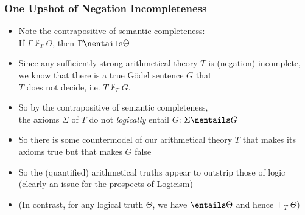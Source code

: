 \begin{frame}
\frametitle{One Upshot of Negation Incompleteness}

\begin{itemize}[<+->]

\item Note the contrapositive of semantic completeness: \\ If $\Gamma \nvdash_{T} \Theta$, then $\Gamma \nentails \Theta$

\item Since any sufficiently strong arithmetical theory $T$ is (negation) incomplete, we know that there is a true G\"odel sentence $G$ that \\ $T$ does not decide, i.e. $T \nvdash_T G$.

\item So by the contrapositive of semantic completeness, \\ the axioms $\Sigma$ of $T$ do not \textit{logically} entail $G$: $\Sigma \nentails G$

\item So there is some countermodel of our arithmetical theory $T$ that makes its axioms true but that makes $G$ false

\item So the (quantified) arithmetical truths appear to outstrip those of logic (clearly an issue for the prospects of Logicism)

\item (In contrast, for any logical truth $\Theta$, we have $\entails \Theta$ and hence $\vdash_T \Theta$)


\end{itemize}
\end{frame}

